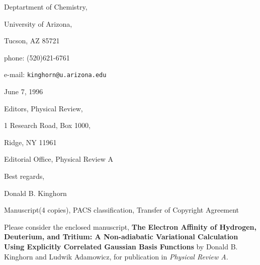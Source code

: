 \documentclass[12pt]{article}
\begin{document}
\begin{letterfrom}
\end{letterfrom}

\begin{letterfromcompany}
\end{letterfromcompany}

\begin{letterfromaddr}
Deptartment of Chemistry,

University of Arizona,

Tucson, AZ 85721\newline

phone: (520)621-6761

e-mail: \texttt{kinghorn@u.arizona.edu}
\end{letterfromaddr}

\begin{letterdate}
June 7, 1996
\end{letterdate}

\begin{letterto}
\end{letterto}

\begin{lettertoaddr}
Editors, Physical Review,

1 Research Road, Box 1000,

Ridge, NY 11961
\end{lettertoaddr}

\begin{letterattention}
Editorial Office, Physical Review A
\end{letterattention}

\begin{lettersubj}
\end{lettersubj}

\begin{letterclosing}
Best regards,
\end{letterclosing}

\begin{lettersign}
Donald B. Kinghorn
\end{lettersign}

\begin{letterps}
\end{letterps}

\begin{letterinitials}
\end{letterinitials}

\begin{lettercc}
\end{lettercc}

\begin{letterencl}
Manuscript(4 copies), PACS classification,  Transfer of Copyright Agreement
\end{letterencl}

\begin{letteropening}
\end{letteropening}

Please consider the enclosed manuscript, \textbf{The Electron Affinity of
Hydrogen, Deuterium, and Tritium: A Non-adiabatic Variational Calculation
Using Explicitly Correlated Gaussian Basis Functions} by Donald B. Kinghorn
and Ludwik Adamowicz, for publication in \emph{Physical Review A}.
\end{document}

